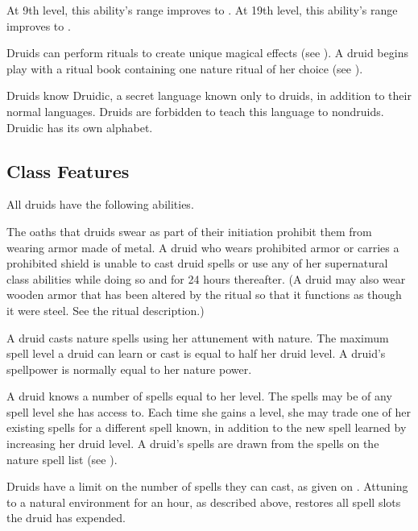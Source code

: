 At 9th level, this ability's range improves to \rngclose.
At 19th level, this ability's range improves to \rngmed.

Druids can perform rituals to create unique magical effects (see ).
A druid begins play with a ritual book containing one nature ritual of her choice (see ).

Druids know Druidic, a secret language known only to druids, in addition to their normal languages.
Druids are forbidden to teach this language to nondruids.
Druidic has its own alphabet.

\subsection{Class Features}
All druids have the following abilities.

The oaths that druids swear as part of their initiation prohibit them from wearing armor made of metal.
A druid who wears prohibited armor or carries a prohibited shield is unable to cast druid spells or use any of her supernatural class abilities while doing so and for 24 hours thereafter.
(A druid may also wear wooden armor that has been altered by the  ritual so that it functions as though it were steel. See the ritual description.)

A druid casts nature spells using her attunement with nature.
The maximum spell level a druid can learn or cast is equal to half her druid level.
A druid's spellpower is normally equal to her nature power.

A druid knows a number of spells equal to her level.
The spells may be of any spell level she has access to.
Each time she gains a level, she may trade one of her existing spells for a different spell known, in addition to the new spell learned by increasing her druid level.
A druid's spells are drawn from the spells on the nature spell list (see ).

Druids have a limit on the number of spells they can cast, as given on .
Attuning to a natural environment for an hour, as described above, restores all spell slots the druid has expended.

